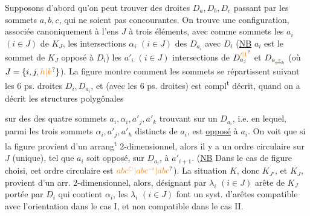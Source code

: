 Supposons d'abord qu'on peut trouver
des droites $D_a,D_b,D_c$ passant par les
sommets $a,b,c$, qui ne soient pas concourantes.
On trouve une configuration,
associée canoniquement à l'ens
$J$ à trois éléments, avec comme
 sommets les $a_i$ $(i\in J)$ de
$K_J$, les intersections $\alpha_i$ $(i\in J)$
des $D_{a_i}$ avec $D_i$ (\uline{NB} $a_i$ est
le sommet de $K_J$ opposé à $D_i$)
les $a'_i$ $(i\in J)$ intersections de $D^{\unsure{\prime|1}}_{a_j}$ et $D_{a_{\deleted{\unsure{j}}k}}$ (où
$J=\{i,j,\unsure{h|k}\}$).  La figure montre comment
les sommets se répartissent suivant les 6
ps. droites $D_i,D_{a_i}$, et  
(avec les 6 ps. droites) est compl\textsuperscript{t} décrit,
quand on a décrit les structures polygônales

sur   des  des quatre sommets
$a_i,\alpha_i,a'_j,a'_k$  trouvant sur un $D_{a_i}$,
i.e. en  lequel, parmi les trois
sommets $\alpha_i,a'_j,a'_h$ distincts de $a_i$, est
\uline{opposé} à $a_i$. On voit que si la
figure  provient d'un arrang\textsuperscript{t} 2-dimensionnel,
alors il y a  un ordre circulaire
sur $J$ (unique), tel que $a_i$ soit opposé,
sur $D_{a_i}$, à $a'_{i+1}$. (\uline{NB} Dans le cas
de figure choisi, cet ordre circulaire est
$\unsure{abc^{\circlearrowright}|abc^{\rightarrow}|abc}$).
  
 La situation $K$, donc
$K_{J'}$,  et $K_J$, provient d'un arr. 2-dimensionnel,
alors,  désignant par
$\lambda_i$ $(i\in J)$  arête de $K_J$  portée
par $D_i$ qui contient $\alpha_i$, les $\lambda_i$ $(i\in J)$
font un syst. d'arêtes compatible avec
l'orientation dans le cas I, et non compatible
dans le cas II.

